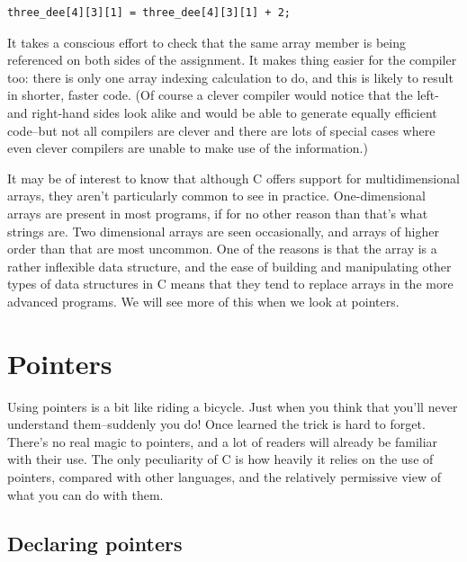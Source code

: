    \begin{Verbatim}
three_dee[4][3][1] = three_dee[4][3][1] + 2;
\end{Verbatim}

   It takes a conscious effort to check that the same array member is
    being referenced on both sides of the assignment. It makes thing easier
    for the compiler too: there is only one array indexing calculation to
    do, and this is likely to result in shorter, faster code. (Of course
    a clever compiler would notice that the left- and right-hand sides look
    alike and would be able to generate equally efficient code--but not
    all compilers are clever and there are lots of special cases where even
    clever compilers are unable to make use of the information.)


   It may be of interest to know that although C offers support for
    multidimensional arrays, they aren't particularly common to see in
    practice. One-dimensional arrays are present in most programs, if for no
    other reason than that's what strings are. Two dimensional arrays are
    seen occasionally, and arrays of higher order than that are most
    uncommon. One of the reasons is that the array is a rather inflexible
    data structure, and the ease of building and manipulating other types of
    data structures in C means that they tend to replace arrays in the more
    advanced programs. We will see more of this when we look at
    pointers.


  

 
        \section{Pointers}
        

  

  Using pointers is a bit like riding a bicycle. Just when you think that
   you'll never understand them--suddenly you do! Once learned the trick
   is hard to forget. There's no real magic to pointers, and a lot of
   readers will already be familiar with their use. The only peculiarity of
   C is how heavily it relies on the use of pointers, compared with other
   languages, and the relatively permissive view of what you can do with
   them.


  \subsection{Declaring pointers}
   

